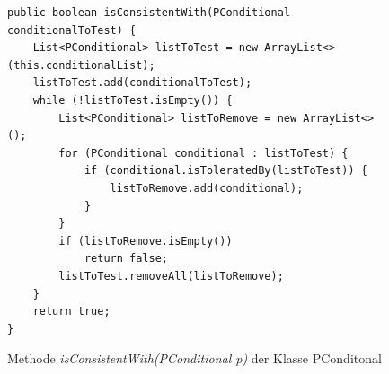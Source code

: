 \documentclass[12pt,a4paper]{article}
\begin{document}
\begin{figure}
\begin{lstlisting}
public boolean isConsistentWith(PConditional conditionalToTest) {
    List<PConditional> listToTest = new ArrayList<>(this.conditionalList);
    listToTest.add(conditionalToTest);
    while (!listToTest.isEmpty()) {
        List<PConditional> listToRemove = new ArrayList<>();
        for (PConditional conditional : listToTest) {
            if (conditional.isToleratedBy(listToTest)) {
                listToRemove.add(conditional);
            }
        }
        if (listToRemove.isEmpty())
            return false;
        listToTest.removeAll(listToRemove);
    }
    return true;
}
\end{lstlisting}
\caption{Methode \textit{isConsistentWith(PConditional p)}  der Klasse PConditonal}
\label{code:kb-consistent}
\end{figure} 
\end{document}
